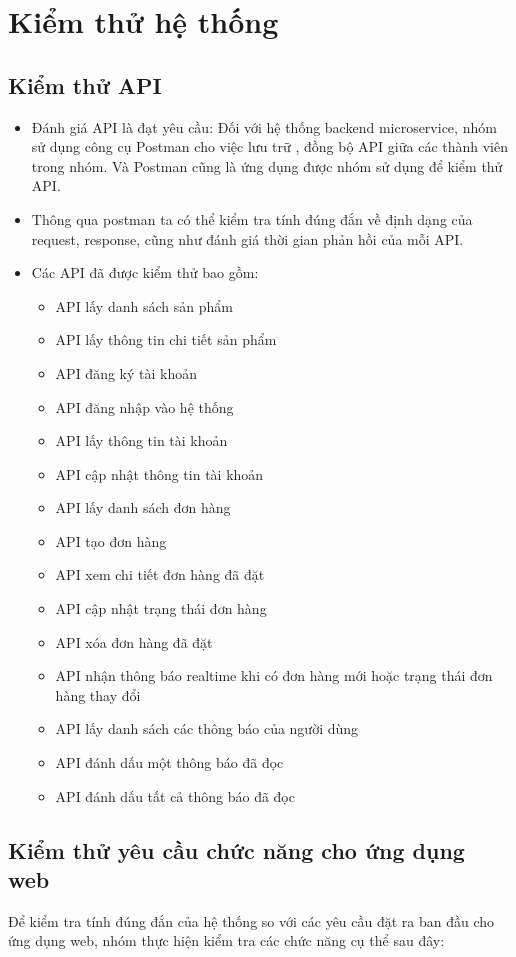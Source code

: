 \section{Kiểm thử hệ thống}
\subsection{Kiểm thử API}
\begin{itemize}
  \item Đánh giá API là đạt yêu cầu: Đối với hệ thống backend microservice, nhóm sử dụng công cụ Postman cho việc lưu trữ
, đồng bộ API giữa các thành viên trong nhóm. Và Postman cũng là ứng dụng được nhóm sử dụng để kiểm thử API.
  \item Thông qua postman ta có thể kiểm tra tính đúng đắn về định dạng của request, response, cũng
  như đánh giá thời gian phản hồi của mỗi API.
  \item Các API đã được kiểm thử bao gồm:
    \begin{itemize}
      \item API lấy danh sách sản phẩm
      \item API lấy thông tin chi tiết sản phẩm
      \item API đăng ký tài khoản
      \item API đăng nhập vào hệ thống
      \item API lấy thông tin tài khoản
      \item API cập nhật thông tin tài khoản
      \item API lấy danh sách đơn hàng
      \item API tạo đơn hàng
      \item API xem chi tiết đơn hàng đã đặt
      \item API cập nhật trạng thái đơn hàng
      \item API xóa đơn hàng đã đặt
      \item API nhận thông báo realtime khi có đơn hàng mới hoặc trạng thái đơn hàng thay đổi
      \item API lấy danh sách các thông báo của người dùng
      \item API đánh dấu một thông báo đã đọc
      \item API đánh dấu tất cả thông báo đã đọc
    \end{itemize}
\end{itemize}
\subsection{Kiểm thử yêu cầu chức năng cho ứng dụng web}
Để kiểm tra tính đúng đắn của hệ thống so với các yêu cầu đặt ra ban đầu cho ứng dụng web, nhóm
thực hiện kiểm tra các chức năng cụ thể sau đây:
